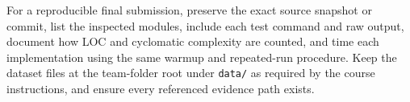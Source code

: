 \documentclass[11pt,a4paper]{article}
\newcommand{\code}[1]{\texttt{#1}}
\begin{document}
For a reproducible final submission, preserve the exact source snapshot or commit, list the inspected modules, include each test command and raw output, document how LOC and cyclomatic complexity are counted, and time each implementation using the same warmup and repeated-run procedure. Keep the dataset files at the team-folder root under \code{data/} as required by the course instructions, and ensure every referenced evidence path exists.
\end{document}
